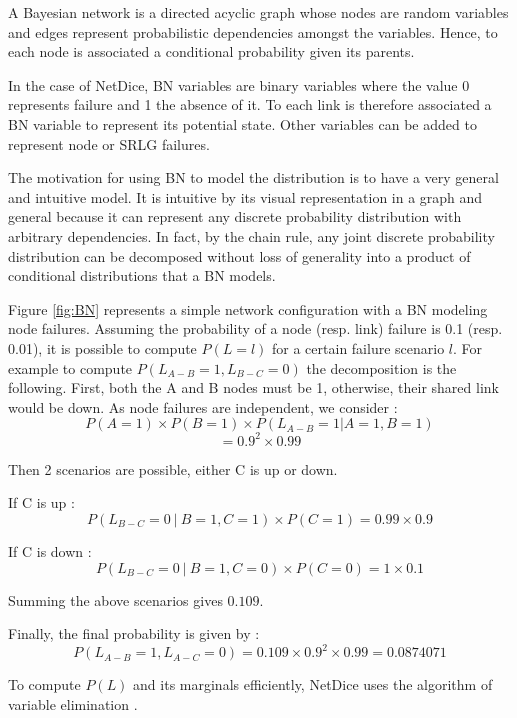 A Bayesian network is a directed acyclic graph whose nodes are random variables and edges represent probabilistic dependencies amongst the variables. Hence, to each node is associated a conditional probability given its parents.    

In the case of NetDice, BN variables are binary variables where the value 0 represents failure and 1 the absence of it. To each link is therefore associated a BN variable to represent its potential state. Other variables can be added to represent node or SRLG failures.  

The motivation for using BN to model the distribution is to have a very general and intuitive model.
It is intuitive by its visual representation in a graph and general because it can represent any discrete probability distribution with arbitrary dependencies. In fact, by the chain rule, any joint discrete probability distribution can be decomposed without loss of generality into a product of conditional distributions that a BN models.



Figure \ref{fig:BN} represents a simple network configuration with a BN modeling node failures.
Assuming the probability of a node (resp. link) failure is 0.1 (resp. 0.01), it is possible to compute $P(L = l)$ for a certain failure scenario $l$. 
For example to compute $P(L_{A-B} = 1, L_{B-C} = 0)$ the decomposition is the following.
First, both the A and B  nodes must be 1, otherwise, their shared link would be down. As node failures are independent, we consider :
\[P(A = 1) \times P(B = 1) \times P(L_{A-B} = 1 | A=1,B=1) \] 
\[= 0.9^2 \times 0.99 \]

Then 2 scenarios are possible, either C is up or down.

If C is up :
\[P(L_{B-C}=0~|~B=1,C=1) \times P(C =1) = 0.99 \times 0.9\]  

If C is down : 
\[P(L_{B-C}=0~|~B=1,C=0) \times P(C=0) = 1 \times 0.1\]  

Summing the above scenarios gives $0.109$.

Finally, the final probability is given by : 
\[P(L_{A-B} = 1, L_{A-C} = 0) = 0.109 \times 0.9^2 \times 0.99 = 0.0874071\]

To compute $P(L)$ and its marginals efficiently, NetDice uses the algorithm of variable elimination \cite{VE}.

